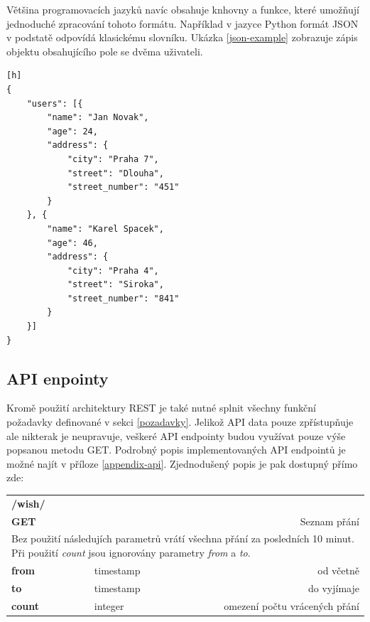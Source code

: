 \documentclass[thesis=B,czech]{FITthesis}[2012/06/26]
\begin{document}
	Většina programovacích jazyků navíc obsahuje knhovny a funkce, které umožňují jednoduché zpracování tohoto formátu. Například v jazyce Python formát JSON v podstatě odpovídá klasickému slovníku. Ukázka \ref{json-example} zobrazuje zápis objektu obsahujícího pole se dvěma uživateli. 
\begin{lstlisting}[caption={JSON obsahující pole se dvěma uživateli},label=json-example][h]
{
	"users": [{
		"name": "Jan Novak",
		"age": 24,
		"address": {
			"city": "Praha 7",
			"street": "Dlouha",
			"street_number": "451"
		}
	}, {
		"name": "Karel Spacek",
		"age": 46,
		"address": {
			"city": "Praha 4",
			"street": "Siroka",
			"street_number": "841"
		}
	}]
}
\end{lstlisting}
	
\subsection{API enpointy}
	Kromě použití architektury REST je také nutné splnit všechny funkční požadavky definované v sekci \ref{pozadavky}. Jelikož API data pouze zpřístupňuje ale nikterak je neupravuje, veškeré API endpointy budou využívat pouze výše popsanou metodu GET. Podrobný popis implementovaných API endpointů je možné najít v příloze \ref{appendix-api}. Zjednodušený popis je pak dostupný přímo zde: 
	

\begin{table}[h]
\begin{tabular}{llllr}
\rowcolor[HTML]{EFEFEF}
\large \textbf{/wish/}        &         &                 &        & \multicolumn{1}{l}{}                \\
\rowcolor[HTML]{EFEFEF}
\textbf{GET}          &         &                 &        & Seznam přání                        \\
\multicolumn{5}{l}{\parbox[t]{12.8cm}{Bez použití následujích parametrů vrátí všechna přání za posledních 10 minut. Při použití \textit{count} jsou ignorovány parametry  \textit{from} a \textit{to}.}  } \\
\textbf{from}         &         & timestamp       &        & od včetně                           \\
\textbf{to}           &         & timestamp       &        & do vyjímaje                         \\
\textbf{count}        &         & integer         &        & omezení počtu vrácených přání      \\
\end{tabular}
\end{table}
\end{document}
